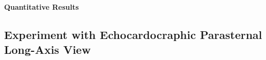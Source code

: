 \paragraph{Quantitative Results}

\subsection{Experiment with Echocardocraphic Parasternal Long-Axis View}




